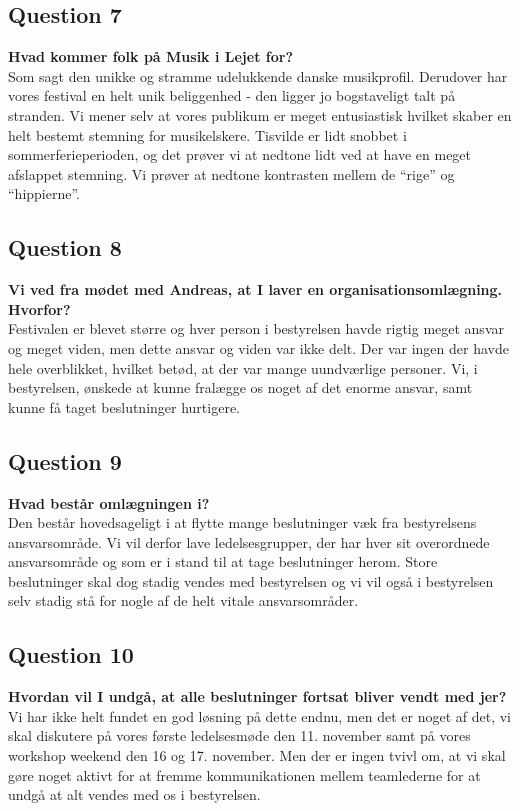 \subsection{Question 7}
\noindent \textbf{Hvad kommer folk på Musik i Lejet for?} \\
Som sagt den unikke og stramme udelukkende danske musikprofil. Derudover har vores festival en helt unik beliggenhed - den ligger jo bogstaveligt talt på stranden. Vi mener selv at vores publikum er meget entusiastisk hvilket skaber en helt bestemt stemning for musikelskere. Tisvilde er lidt snobbet i sommerferieperioden, og det prøver vi at nedtone lidt ved at have en meget afslappet stemning. Vi prøver at nedtone kontrasten mellem de “rige” og “hippierne”.

\subsection{Question 8}
\noindent \textbf{Vi ved fra mødet med Andreas, at I laver en organisationsomlægning. Hvorfor?} \\
Festivalen er blevet større og hver person i bestyrelsen havde rigtig meget ansvar og meget viden, men dette ansvar og viden var ikke delt. Der var ingen der havde hele overblikket, hvilket betød, at der var mange uundværlige personer. Vi, i bestyrelsen, ønskede at kunne fralægge os noget af det enorme ansvar, samt kunne få taget beslutninger hurtigere. 

\subsection{Question 9}
\noindent \textbf{Hvad består omlægningen i?} \\
Den består hovedsageligt i at flytte mange beslutninger væk fra bestyrelsens ansvarsområde. Vi vil derfor lave ledelsesgrupper, der har hver sit overordnede ansvarsområde og som er i stand til at tage beslutninger herom. Store beslutninger skal dog stadig vendes med bestyrelsen og vi vil også i bestyrelsen selv stadig stå for nogle af de helt vitale ansvarsområder. 

\subsection{Question 10}
\noindent \textbf{Hvordan vil I undgå, at alle beslutninger fortsat bliver vendt med jer?} \\
Vi har ikke helt fundet en god løsning på dette endnu, men det er noget af det, vi skal diskutere på vores første ledelsesmøde den 11. november samt på vores workshop weekend den 16 og 17. november. Men der er ingen tvivl om, at vi skal gøre noget aktivt for at fremme kommunikationen mellem teamlederne for at undgå at alt vendes med os i bestyrelsen.

